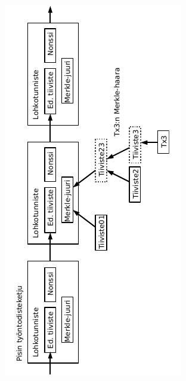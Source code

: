 \documentclass{article}
\begin{document}
\begin{figure}[H]
    \centering
    \includegraphics[angle=270,width=\textwidth]{figures/fig5.pdf}
\end{figure}
\end{document}
